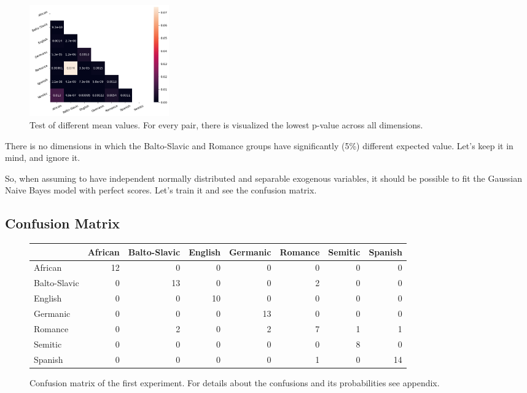 \documentclass[a4paper,10pt]{article}
\begin{document}
\begin{figure}[H]
       \begin{center}
              \includegraphics[width=6cm]{../figures/test_mean_difference.png}
       \end{center}
       \caption{Test of different mean values. For every pair, there is visualized the lowest p-value across all dimensions.}
\end{figure}

There is no dimensions in which the Balto-Slavic and Romance groups have significantly (5\%) different expected value.
Let's keep it in mind, and ignore it.

So, when assuming to have independent normally distributed and separable exogenous variables, it should be possible to fit the Gaussian Naive Bayes model with perfect scores. Let's train it and see the confusion matrix.

\subsection{Confusion Matrix}

\begin{figure}[H]
\begin{longtable}[]{@{}lrrrrrrr@{}}
\toprule
    & African & Balto-Slavic & English & Germanic & Romance & Semitic & Spanish \\
\midrule
\endhead
African & 12 & 0 & 0 & 0 & 0 & 0 & 0 \\
Balto-Slavic & 0 & 13 & 0 & 0 & 2 & 0 & 0 \\
English & 0 & 0 & 10 & 0 & 0 & 0 & 0 \\
Germanic & 0 & 0 & 0 & 13 & 0 & 0 & 0 \\
Romance & 0 & 2 & 0 & 2 & 7 & 1 & 1 \\
Semitic & 0 & 0 & 0 & 0 & 0 & 8 & 0 \\
Spanish & 0 & 0 & 0 & 0 & 1 & 0 & 14 \\
\bottomrule
\end{longtable}
\caption{Confusion matrix of the first experiment. For details about the confusions and its probabilities see appendix.}
\end{figure}
\end{document}
